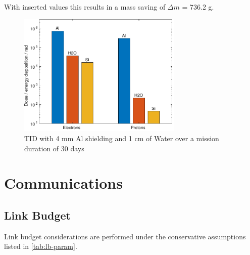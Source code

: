 With inserted values this results in a mass saving of \(\Delta m\) = 736.2 g.

\begin{figure}[htp]
	\centering
	\includegraphics[width=0.7\textwidth]{Media/J_Improvements_Ice}
	\caption{TID with 4 mm Al shielding and 1 cm of Water over a mission duration of 30 days}
	\label{fig:Radiation_Improvements_Ice}
\end{figure}

\clearpage


\section{Communications} 
\label{sec:AppendixCOM}

\subsection{Link Budget}

Link budget considerations are performed under the conservative assumptions listed in \autoref{tab:lb-param}. \\

